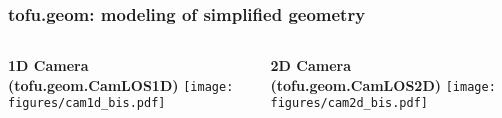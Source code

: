 \documentclass[10pt]{beamer}
\begin{document}
%
%


\begin{frame}
\frametitle{tofu.geom: modeling of simplified geometry}
\begin{columns}
		\begin{column}{0.5\textwidth}
		\begin{center}
		\textbf{1D Camera\\(tofu.geom.CamLOS1D)}
		\texttt{[image: figures/cam1d\_bis.pdf]}
	\end{center}
		\end{column}
		\pause
		\begin{column}{0.5\textwidth}
		\begin{center}
		\textbf{2D Camera\\(tofu.geom.CamLOS2D)}
		\texttt{[image: figures/cam2d\_bis.pdf]}
	\end{center}	
		\end{column}
	\end{columns}
\end{frame}
\end{document}
